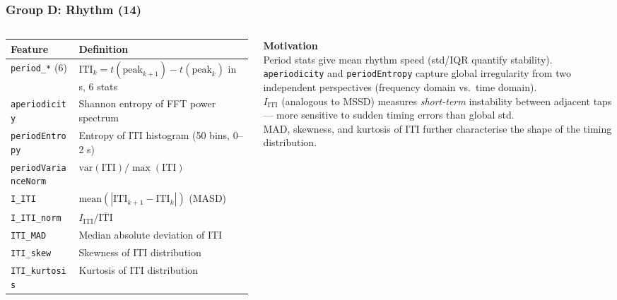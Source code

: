 \documentclass[aspectratio=169]{beamer}
\begin{document}
\begin{frame}
    \frametitle{Group D: Rhythm (14)}
    \scriptsize
    \begin{columns}[T]
        \renewcommand{\arraystretch}{1.2}
        \begin{tabular}{p{3.4cm}p{3.6cm}}
            \toprule
            \textbf{Feature} & \textbf{Definition} \\
            \midrule
            \texttt{period\_*} (6) & $\text{ITI}_k = t(\text{peak}_{k+1})-t(\text{peak}_k)$ in s, 6 stats \\
            \texttt{aperiodicity} & Shannon entropy of FFT power spectrum \\
            \texttt{periodEntropy} & Entropy of ITI histogram (50 bins, 0--2 s) \\
            \texttt{periodVarianceNorm} & $\mathrm{var(ITI)}/\max(\mathrm{ITI})$ \\
            \texttt{I\_ITI} & $\mathrm{mean}(|\text{ITI}_{k+1}-\text{ITI}_k|)$ (MASD) \\
            \texttt{I\_ITI\_norm} & $I_\text{ITI}/\bar{\text{ITI}}$ \\
            \texttt{ITI\_MAD} & Median absolute deviation of ITI \\
            \texttt{ITI\_skew} & Skewness of ITI distribution \\
            \texttt{ITI\_kurtosis} & Kurtosis of ITI distribution \\
            \bottomrule
        \end{tabular}

        \textbf{Motivation}\\[0.3em]
        Period stats give mean rhythm speed (std/IQR quantify stability). \texttt{aperiodicity} and \texttt{periodEntropy} capture global irregularity from two independent perspectives (frequency domain vs.\ time domain).\\[0.4em]
        $I_\text{ITI}$ (analogous to MSSD) measures \emph{short-term} instability between adjacent taps --- more sensitive to sudden timing errors than global std.\\[0.4em]
        MAD, skewness, and kurtosis of ITI further characterise the shape of the timing distribution.
    \end{columns}
\end{frame}
\end{document}
